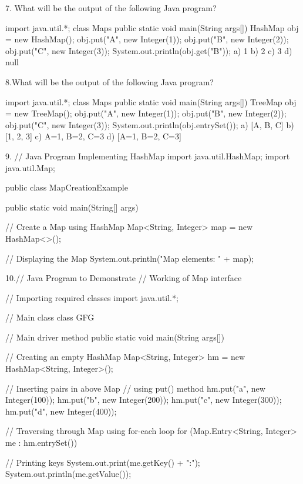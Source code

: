 {7. What will be the output of the following Java program?

    import java.util.*;
    class Maps 
    {
        public static void main(String args[]) 
        {
            HashMap obj = new HashMap();
            obj.put("A", new Integer(1));
            obj.put("B", new Integer(2));
            obj.put("C", new Integer(3));
            System.out.println(obj.get("B"));
        }
    }
a) 1
b) 2
c) 3
d) null

8.What will be the output of the following Java program?

    import java.util.*;
    class Maps 
    {
        public static void main(String args[]) 
        {
            TreeMap obj = new TreeMap();
            obj.put("A", new Integer(1));
            obj.put("B", new Integer(2));
            obj.put("C", new Integer(3));
            System.out.println(obj.entrySet());
        }
    }
a) [A, B, C]
b) [1, 2, 3]
c) {A=1, B=2, C=3}
d) [A=1, B=2, C=3]

9.
// Java Program Implementing HashMap
import java.util.HashMap;
import java.util.Map;

public class MapCreationExample {
    
      public static void main(String[] args) 
    {
      
        // Create a Map using HashMap
        Map<String, Integer> map = new HashMap<>();
                
        // Displaying the Map
        System.out.println("Map elements: " + map);
    }
}

10.// Java Program to Demonstrate
// Working of Map interface

// Importing required classes
import java.util.*;

// Main class
class GFG {

    // Main driver method
    public static void main(String args[])
    {
        // Creating an empty HashMap
        Map<String, Integer> hm
            = new HashMap<String, Integer>();

        // Inserting pairs in above Map
        // using put() method
        hm.put("a", new Integer(100));
        hm.put("b", new Integer(200));
        hm.put("c", new Integer(300));
        hm.put("d", new Integer(400));

        // Traversing through Map using for-each loop
        for (Map.Entry<String, Integer> me :
             hm.entrySet()) {

            // Printing keys
            System.out.print(me.getKey() + ":");
            System.out.println(me.getValue());
        }
    }
}


}

